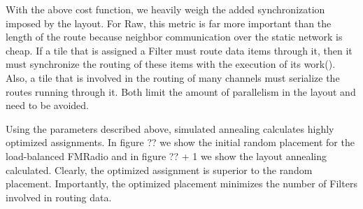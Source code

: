 With the above cost function, we heavily weigh the added
synchronization imposed by the layout.  For Raw, this metric is far
more important than the length of the route because neighbor
communication over the static network is cheap.  If a tile that is
assigned a Filter must route data items through it, then it must
synchronize the routing of these items with the execution of its
work().  Also, a tile that is involved in the routing of many channels
must serialize the routes running through it.  Both limit the amount
of parallelism in the layout and need to be avoided.

Using the parameters described above, simulated annealing calculates
highly optimized assignments.  In figure ??
we show the initial random placement for the load-balanced FMRadio and
in figure ?? + 1 we show the layout annealing calculated.  Clearly,
the optimized assignment is superior to the random placement.
Importantly, the optimized placement minimizes the number of Filters
involved in routing data.
